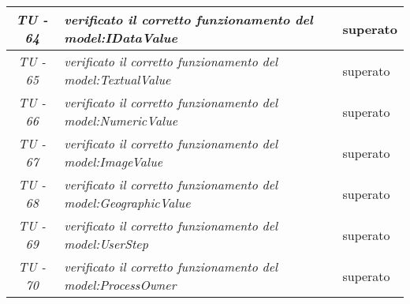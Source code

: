 \begin{small}\centering
\begin{tabular}{|c|p{8.0cm}|p{2.0cm}|}
\textit{TU - 64} &
\textit{verificato il corretto funzionamento del model:IDataValue} & superato \\
\hline

\textit{TU - 65} &
\textit{verificato il corretto funzionamento del model:TextualValue} & superato \\
\hline

\textit{TU - 66} &
\textit{verificato il corretto funzionamento del model:NumericValue} & superato \\
\hline

\textit{TU - 67} &
\textit{verificato il corretto funzionamento del model:ImageValue} & superato \\
\hline

\textit{TU - 68} &
\textit{verificato il corretto funzionamento del model:GeographicValue} & superato \\
\hline

\textit{TU - 69} &
\textit{verificato il corretto funzionamento del model:UserStep} & superato \\
\hline

\textit{TU - 70} &
\textit{verificato il corretto funzionamento del model:ProcessOwner} & superato \\
\hline
\end{tabular}\\
\end{small}